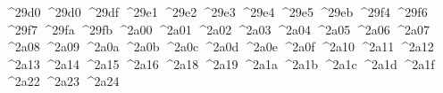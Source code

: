 {  ^^^^29d0%
  ^^^^29d0%
  ^^^^29df%
  ^^^^29e1%
  ^^^^29e2%
  ^^^^29e3%
  ^^^^29e4%
  ^^^^29e5%
  ^^^^29eb%
  ^^^^29f4%
  ^^^^29f6%
  ^^^^29f7%
  ^^^^29fa%
  ^^^^29fb%
  ^^^^2a00%
  ^^^^2a01%
  ^^^^2a02%
  ^^^^2a03%
  ^^^^2a04%
  ^^^^2a05%
  ^^^^2a06%
  ^^^^2a07%
  ^^^^2a08%
  ^^^^2a09%
  ^^^^2a0a%
  ^^^^2a0b%
  ^^^^2a0c%
  ^^^^2a0d%
  ^^^^2a0e%
  ^^^^2a0f%
  ^^^^2a10%
  ^^^^2a11%
  ^^^^2a12%
  ^^^^2a13%
  ^^^^2a14%
  ^^^^2a15%
  ^^^^2a16%
  ^^^^2a18%
  ^^^^2a19%
  ^^^^2a1a%
  ^^^^2a1b%
  ^^^^2a1c%
  ^^^^2a1d%
  ^^^^2a1f%
  ^^^^2a22%
  ^^^^2a23%
  ^^^^2a24%
}
